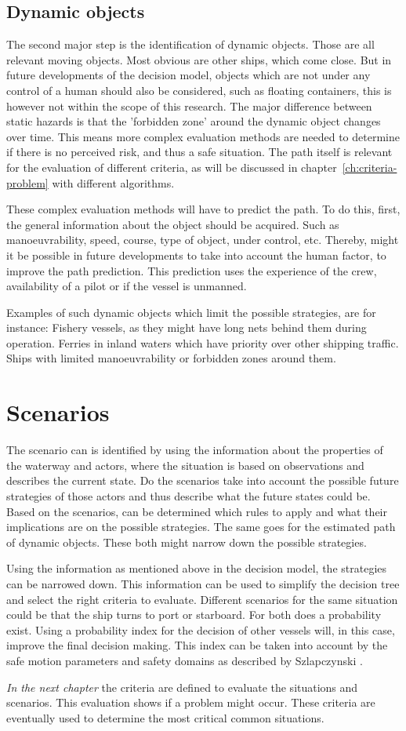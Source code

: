 \subsection{Dynamic objects}
The second major step is the identification of dynamic objects. Those are all relevant moving objects. Most obvious are other ships, which come close. But in future developments of the decision model, objects which are not under any control of a human should also be considered, such as floating containers, this is however not within the scope of this research. The major difference between static hazards is that the 'forbidden zone' around the dynamic object changes over time. This means more complex evaluation methods are needed to determine if there is no perceived risk, and thus a safe situation. The path itself is relevant for the evaluation of different criteria, as will be discussed in chapter~\ref{ch:criteria-problem} with different algorithms.

These complex evaluation methods will have to predict the path. To do this, first, the general information about the object should be acquired. Such as manoeuvrability, speed, course, type of object, under control, etc.
Thereby, might it be possible in future developments to take into account the human factor, to improve the path prediction. This prediction uses the experience of the crew, availability of a pilot or if the vessel is unmanned.

Examples of such dynamic objects which limit the possible strategies, are for instance: Fishery vessels, as they might have long nets behind them during operation. Ferries in inland waters which have priority over other shipping traffic. Ships with limited manoeuvrability or forbidden zones around them.

\section{Scenarios}
The scenario can is identified by using the information about the properties of the waterway and actors, where the situation is based on observations and describes the current state. Do the scenarios take into account the possible future strategies of those actors and thus describe what the future states could be.
Based on the scenarios, can be determined which rules to apply and what their implications are on the possible strategies. The same goes for the estimated path of dynamic objects. These both might narrow down the possible strategies.

Using the information as mentioned above in the decision model, the strategies can be narrowed down. This information can be used to simplify the decision tree and select the right criteria to evaluate.
Different scenarios for the same situation could be that the ship turns to port or starboard. For both does a probability exist. Using a probability index for the decision of other vessels will, in this case, improve the final decision making. This index can be taken into account by the safe motion parameters and safety domains as described by Szlapczynski \cite{Szlapczynski2017}\cite{Szlapczynski2017a}.

\vspace{1.5cm}
\emph{In the next chapter} the criteria are defined to evaluate the situations and scenarios. This evaluation shows if a problem might occur. These criteria are eventually used to determine the most critical common situations. 

